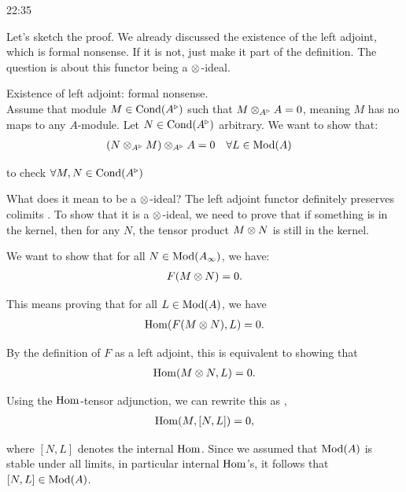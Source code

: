 \begin{unfinished}{22:35}

Let's sketch the proof. We already discussed the existence of the left adjoint, which is formal nonsense. If it is not, just make it part of the definition. 
The question is about this functor being a $\otimes$-ideal.

\begin{sketch}
Existence of left adjoint: formal nonsense.\\

Assume that module $M \in \mathrm{Cond}(A^\triangleright)$ such that $M \otimes_{A^\triangleright} A = 0$, meaning $M$ has no maps to any $A$-module.
Let $N \in \mathrm{Cond}(A^\triangleright)$ arbitrary.
We want to show that:
\begin{align*}
(N \otimes_{A^\triangleright} M) \otimes_{A^\triangleright} A = 0 \quad & \forall L \in \operatorname{Mod}(A)
\end{align*}

to check $\forall M, N \in \mathrm{Cond}(A^\triangleright)$
\end{sketch}

What does it mean to be a $\otimes$-ideal? 
The left adjoint functor definitely preserves colimits . To show that it is a $\otimes$-ideal, we need to prove that if something is in the kernel, then for any $N$, the tensor product $M \otimes N$ is still in the kernel.

We want to show that for all $N \in \operatorname{Mod}(A_\infty)$, we have: 
\begin{align*}
F(M \otimes N) = 0.
\end{align*}

This means proving that for all $L \in \operatorname{Mod}(A)$, we have
\begin{align*}
\operatorname{Hom}(F(M \otimes N), L) = 0. 
\end{align*}

By the definition of $F$ as a left adjoint, this is equivalent to showing that
\begin{align*}
\operatorname{Hom}(M \otimes N, L) = 0.
\end{align*}

Using the $\operatorname{Hom}$-tensor adjunction, we can rewrite this as , 
\begin{align*}
\operatorname{Hom}(M, [N,L]) = 0,
\end{align*}

where $[N,L]$ denotes the internal $\operatorname{Hom}$. Since we assumed that $\operatorname{Mod}(A)$ is stable under all limits, in particular internal $\operatorname{Hom}$'s, it follows that $[N,L] \in \operatorname{Mod}(A)$. 


\end{unfinished}
